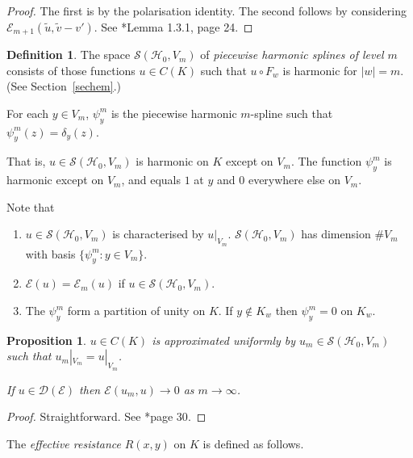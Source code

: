 \documentclass[a4paper]{amsart}
\theoremstyle{plain}
\newtheorem{proposition}[theorem]{Proposition}
\theoremstyle{definition}
\newtheorem{definition}[theorem]{Definition}%
\theoremstyle{remark}
\begin{document}
\begin{proof} The first is by the polarisation identity.  The second   follows by considering $ \mathcal{E} _{m+1}(  \widetilde{ u } ,  \widetilde{ v }  - v'  )$.  See \cite{Str}*{Lemma 1.3.1, page 24}.
\end{proof} 

\begin{definition} The space $ \mathcal{S} ( \mathcal{H} _0, V_m ) $ of \emph{piecewise harmonic splines of level $ m $} consists of those functions $ u \in C(K)$ such that $ u \circ F_w $ is harmonic for $ |w|=m $.  (See Section~\ref{sechem}.)

For each $ y \in V_m $, $ \psi_y^m $ is the piecewise harmonic $ m $-spline such that $  \psi_y^m(z) = \delta _y(z) $.
\end{definition} 

That is, $ u \in \mathcal{S} ( \mathcal{H} _0, V_m ) $ is harmonic on $ K $ except on $ V_m $.  The function $ \psi_y^m $ is harmonic except on $ V_m $, and equals $ 1 $ at $ y $ and $ 0 $ everywhere else on $ V_m $. 

Note that 
\begin{enumerate}
\item $ u \in  \mathcal{S} ( \mathcal{H} _0, V_m ) $ is characterised by $ u|_{V_m} $.  $  \mathcal{S} ( \mathcal{H} _0, V_m ) $  has dimension $ \# V_m $ with basis 
 $ \{  \psi_y^m : y \in V_m \}  $.
\item $ \mathcal{E} (u ) = \mathcal{E} _m (u) $ if $  u \in  \mathcal{S} ( \mathcal{H} _0, V_m ) $.
\item The $ \psi_y^m $ form a partition of unity on $ K $. If $ y \notin K_w $ then  $ \psi_y^m =0$ on $ K_w $.
\end{enumerate} 
 

\begin{proposition} \label{p1612} $ u \in C(K) $ is approximated uniformly by $ u_m \in  \mathcal{S} ( \mathcal{H} _0, V_m ) $ such that $ u_m |_{V_m} = u|_{V_m} $.  

If $ u \in \mathcal{D} ( \mathcal{E} ) $ then $ \mathcal{E} (u_m, u) \to 0 $ as $ m \to \infty $.
\end{proposition} 

\begin{proof} Straightforward.  See \cite{Str}*{page 30}.
\end{proof} 

The \emph{effective resistance} $ R(x,y) $ on $ K $   is defined as follows.
\end{document}
